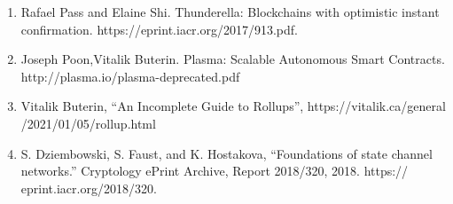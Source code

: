 \documentclass{iacrtrans}
\begin{document}
\begin{enumerate}
	\item Rafael Pass and Elaine Shi. Thunderella: Blockchains with optimistic instant confirmation. https://eprint.iacr.org/2017/913.pdf.
	\item Joseph Poon,Vitalik Buterin. Plasma: Scalable Autonomous Smart Contracts. http://plasma.io/plasma-deprecated.pdf
	\item Vitalik Buterin, “An Incomplete Guide to Rollups”, https://vitalik.ca/general /2021/01/05/rollup.html
	\item S. Dziembowski, S. Faust, and K. Hostakova, “Foundations of state channel networks.” Cryptology ePrint Archive, Report 2018/320, 2018. https:// eprint.iacr.org/2018/320.
\end{enumerate}
\end{document}
